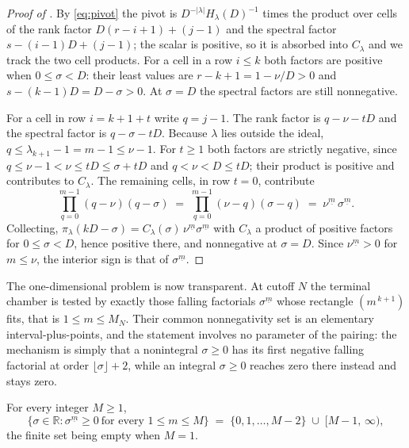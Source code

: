 \documentclass[11pt,letterpaper]{article}
\newcommand{\Rr}{\mathbb{R}}
\begin{document}
\begin{proof}[Proof of ]
By \eqref{eq:pivot} the pivot is $D^{-|\lambda|}H_\lambda(D)^{-1}$ times the
product over cells of the rank factor $D(r-i+1)+(j-1)$ and the spectral factor
$s-(i-1)D+(j-1)$; the scalar is positive, so it is absorbed into $C_\lambda$ and
we track the two cell products. For a cell in a row $i\le k$ both factors are
positive when $0\le\sigma<D$: their least values are $r-k+1=1-\nu/D>0$ and
$s-(k-1)D=D-\sigma>0$. At $\sigma=D$ the spectral factors are still nonnegative.

For a cell in row $i=k+1+t$ write $q=j-1$. The rank factor is $q-\nu-tD$ and the
spectral factor is $q-\sigma-tD$. Because $\lambda$ lies outside the ideal,
$q\le\lambda_{k+1}-1=m-1\le\nu-1$. For $t\ge1$ both factors are strictly
negative, since $q\le\nu-1<\nu\le tD\le\sigma+tD$ and $q<\nu<D\le tD$; their
product is positive and contributes to $C_\lambda$. The remaining cells, in row
$t=0$, contribute
\begin{equation*}
  \prod_{q=0}^{m-1}(q-\nu)(q-\sigma)
  \;=\;\prod_{q=0}^{m-1}(\nu-q)(\sigma-q)
  \;=\;\nu^{\underline m}\,\sigma^{\underline m}.
\end{equation*}
Collecting, $\pi_\lambda(kD-\sigma)=C_\lambda(\sigma)\,\nu^{\underline m}
\sigma^{\underline m}$ with $C_\lambda$ a product of positive factors for
$0\le\sigma<D$, hence positive there, and nonnegative at $\sigma=D$. Since
$\nu^{\underline m}>0$ for $m\le\nu$, the interior sign is that of
$\sigma^{\underline m}$.
\end{proof}

The one-dimensional problem is now transparent. At cutoff $N$ the terminal
chamber is tested by exactly those falling factorials $\sigma^{\underline m}$
whose rectangle $(m^{\,k+1})$ fits, that is $1\le m\le M_N$. Their common
nonnegativity set is an elementary interval-plus-points, and the statement
involves no parameter of the pairing: the mechanism is simply that a nonintegral
$\sigma\ge0$ has its first negative falling factorial at order
$\lfloor\sigma\rfloor+2$, while an integral $\sigma\ge0$ reaches zero there
instead and stays zero.

\begin{lemma}
\label{lem:onevar}
For every integer $M\ge1$,
\begin{equation}
  \bigl\{\sigma\in\Rr:\sigma^{\underline m}\ge0\ \text{for every }1\le m\le M\bigr\}
  \;=\;\{0,1,\dots,M-2\}\;\cup\;[M-1,\,\infty),
  \label{eq:onevar}
\end{equation}
the finite set being empty when $M=1$.
\end{lemma}
\end{document}
